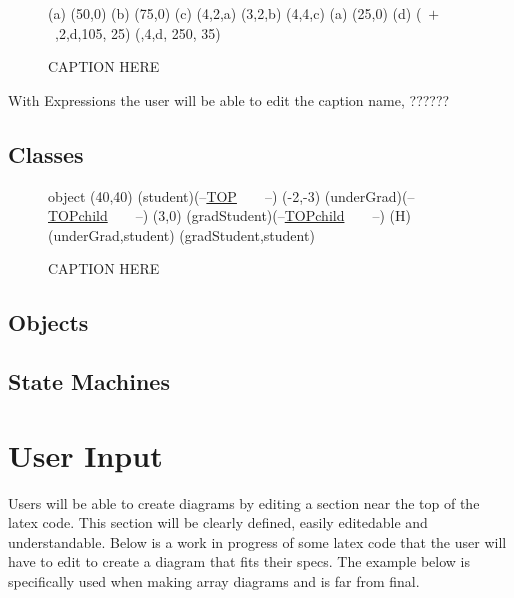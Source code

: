 \documentclass[10pt,a4paper,english]{article}
\begin{document}
\begin{flushleft}
\begin {figure}
\Draw


\MarkLoc(a)
\Move(50,0)
\MarkLoc(b)
\Move(75,0)
\MarkLoc(c)
\boxItDefault(4,2,a)
\boxItDefault(3,2,b)
\boxItDefault(4,4,c)
\MoveToLoc(a)
\Move(25,0)
\MarkLoc(d)
\boxIt(~$  +  $~,2,d,105, 25)
\boxIt(\hspace{135pt}\hfill*\hspace{10pt},4,d, 250, 35)
\EndDraw
\caption {CAPTION HERE }
\label {fig:exprsBoxedAmb1}
\end {figure}

With Expressions the user will be able to edit the caption name, ??????

\subsection*{Classes}

\begin {figure}
\Draw
 {object}
\MinNodeSize(40,40)
\RectNode (student)(--\underline {TOP}~~~~--)
\MoveToExit(-2,-3)
\RectNode (underGrad)(--\underline {TOPchild}~~~~--)
\MoveToExit(3,0)
\RectNode (gradStudent)(--\underline {TOPchild}~~~~--)
\ArrowSpec (H)
\Edge(underGrad,student)
\Edge(gradStudent,student)
\EndDraw
\caption {CAPTION HERE}
\label {fig:studentClasses}
\end {figure}

\subsection*{Objects}

\subsection*{State Machines}

\section{User Input}
Users will be able to create diagrams by editing a section near the top of the latex code.  This section will be clearly defined, easily editedable and understandable.  Below is a work in progress of some latex code that the user will have to edit to create a diagram that fits their specs. The example below is specifically used when making array diagrams and is far from final.


\end{flushleft}
\end{document}
